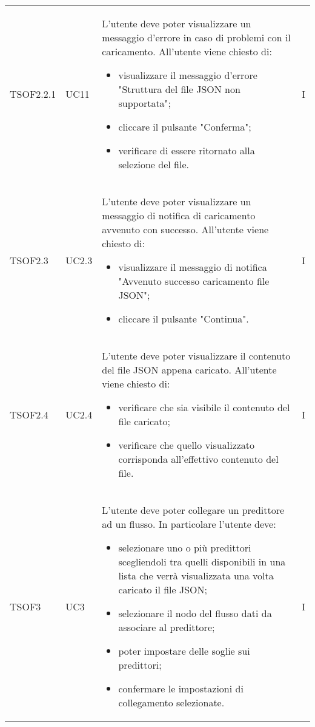 \begin{longtable}{C{2.5cm} C{2.5cm} L{8cm} C{2cm}}
TSOF2.2.1 & UC11 &
L'utente deve poter visualizzare un messaggio d'errore in caso di problemi con il caricamento. \newline All'utente viene chiesto di:
\begin{itemize}
	\item visualizzare il messaggio d'errore "Struttura del file JSON non supportata";
	\item cliccare il pulsante "Conferma";
	\item verificare di essere ritornato alla selezione del file.
\end{itemize} & I	\\

TSOF2.3 & UC2.3 &
L'utente deve poter visualizzare un messaggio di notifica di caricamento avvenuto con successo. \newline All'utente viene chiesto di:
\begin{itemize}
	\item visualizzare il messaggio di notifica "Avvenuto successo caricamento file JSON";
	\item cliccare il pulsante "Continua".
\end{itemize} & I	\\

TSOF2.4 & UC2.4 &
L'utente deve poter visualizzare il contenuto del file JSON appena caricato. \newline All'utente viene chiesto di:
\begin{itemize}
	\item verificare che sia visibile il contenuto del file caricato;
	\item verificare che quello visualizzato corrisponda all'effettivo contenuto del file.
\end{itemize} & I	\\
TSOF3 & 
UC3 &
L'utente  deve poter collegare un predittore ad un flusso. In particolare l'utente deve:
\begin{itemize}
	\item selezionare uno o più predittori scegliendoli tra quelli disponibili in una lista che verrà visualizzata una volta caricato il file JSON;
	\item selezionare il nodo del flusso dati da associare al predittore;
	\item poter impostare delle soglie sui predittori;
	\item confermare le impostazioni di collegamento selezionate.
\end{itemize} &
I \\ 


\end{longtable}
